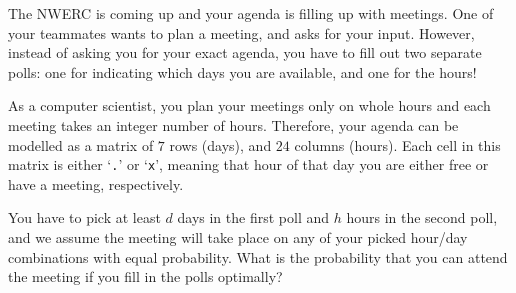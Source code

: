 




The NWERC is coming up and your agenda is filling up with meetings.
One of your teammates wants to plan a meeting, and asks for your input.
However, instead of asking you for your exact agenda, you have to fill out two separate polls:
one for indicating which days you are available, and one for the hours!

As a computer scientist, you plan your meetings only on whole hours and each meeting takes an integer number of hours.
Therefore, your agenda can be modelled as a matrix of $7$ rows (days), and $24$ columns (hours).
Each cell in this matrix is either `\texttt{.}' or `\texttt{x}',
meaning that hour of that day you are either free or have a meeting, respectively.

You have to pick at least $d$ days in the first poll and $h$ hours in the second poll,
and we assume the meeting will take place on any of your picked hour/day combinations with equal probability.
What is the probability that you can attend the meeting if you fill in the polls optimally?

